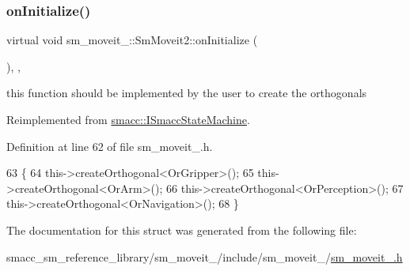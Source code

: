 \subsubsection{\texorpdfstring{on\+Initialize()}{onInitialize()}}
{\footnotesize\ttfamily virtual void sm\+\_\+moveit\+\_\+::\+Sm\+Moveit2\+::on\+Initialize (\begin{DoxyParamCaption}{ }\end{DoxyParamCaption})\hspace{0.3cm}{\ttfamily [inline]}, {\ttfamily [override]}, {\ttfamily [virtual]}}



this function should be implemented by the user to create the orthogonals 



Reimplemented from \hyperlink{classsmacc_1_1ISmaccStateMachine_ac2982c6c8283663e5e1e8a7c82f511ec}{smacc\+::\+I\+Smacc\+State\+Machine}.



Definition at line 62 of file sm\+\_\+moveit\+\_.\+h.


\begin{DoxyCode}
63     \{
64         this->createOrthogonal<OrGripper>();
65         this->createOrthogonal<OrArm>();
66         this->createOrthogonal<OrPerception>();
67         this->createOrthogonal<OrNavigation>();
68     \}
\end{DoxyCode}


The documentation for this struct was generated from the following file\+:\begin{DoxyCompactItemize}
\item 
smacc\+\_\+sm\+\_\+reference\+\_\+library/sm\+\_\+moveit\+\_/include/sm\+\_\+moveit\+\_/\hyperlink{sm__moveit__2_8h}{sm\+\_\+moveit\+\_.\+h}\end{DoxyCompactItemize}
